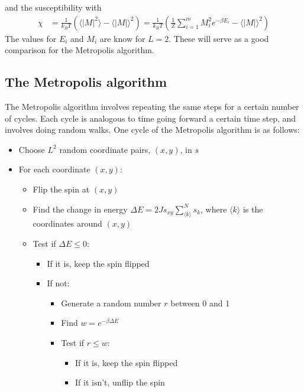 \documentclass[a4paper]{article}
\let\Oldsubsection\subsection
\renewcommand{\subsection}{\FloatBarrier\Oldsubsection}
\begin{document}
and the susceptibility with
\begin{align}
\chi &= \frac{1}{k_BT} \left( \langle |M|^2 \rangle - \langle |M| \rangle ^2 \right)
= \frac{1}{k_BT} \left( \frac{1}{Z} \sum_{i=1}^{m} M_i^2 e^{-\beta E_i} - \langle |M| \rangle ^2 \right)
\end{align}
The values for $E_i$ and $M_i$ are know for $L=2$. These will serve as a good comparison for the Metropolis algorithm. 

\subsection{The Metropolis algorithm}

The Metropolis algorithm involves repeating the same steps for a certain number of cycles. Each cycle is analogous to time going forward a certain time step, and involves doing random walks. One cycle of the Metropolis algorithm is as follows:
\begin{itemize}
	\item Choose $L^2$ random coordinate pairs, $(x,y)$, in $s$
	\item For each coordinate $(x,y):$ 
	\begin{itemize}
		\item Flip the spin at $(x,y)$
		\item Find the change in energy $\Delta E = 2J s_{xy} \sum_{\langle k \rangle}^{N}s_k$, where $\langle k \rangle$ is the coordinates around $(x,y)$
		\item Test if $\Delta E \leq 0:$
		\begin{itemize}
			\item If it is, keep the spin flipped
			\item If not:
			\begin{itemize}
				\item Generate a random number $r$ between 0 and 1
				\item Find $w = e^{-\beta \Delta E}$
				\item Test if $r \leq w:$
				\begin{itemize}
					\item If it is, keep the spin flipped
					\item If it isn't, unflip the spin
				\end{itemize}
			\end{itemize}
		\end{itemize}		
	\end{itemize}
\end{itemize}
\end{document}

